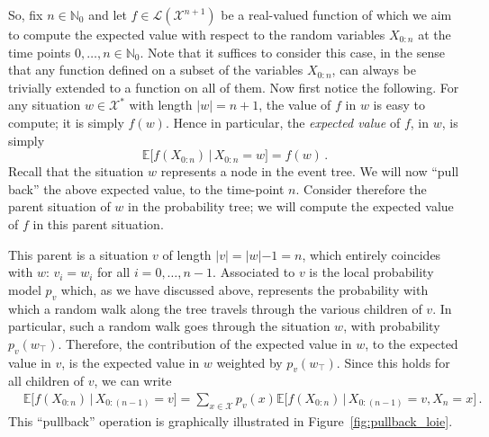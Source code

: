 \documentclass[graybox]{svmult}
\newcommand{\nats}{\mathbb{N}}
\newcommand{\natswith}{\nats_{0}}
\newcommand{\states}{\mathcal{X}}
\newcommand{\gambles}{\mathcal{L}}
\begin{document}
So, fix $n\in\natswith$ and let $f\in\gambles(\states^{n+1})$ be a real-valued function of which we aim to compute the expected value with respect to the random variables $X_{0:n}$ at the time points $0,\ldots,n\in\natswith$. Note that it suffices to consider this case, in the sense that any function defined on a subset of the variables $X_{0:n}$, can always be trivially extended to a function on all of them. Now first notice the following. For any situation $w\in\states^*$ with length $\lvert w\rvert = n+1$, the value of $f$ in $w$ is easy to compute; it is simply $f(w)$. Hence in particular, the \emph{expected value} of $f$, in $w$, is simply
\begin{equation*}
\mathbb{E}\bigl[f(X_{0:n})\,\big\vert\,X_{0:n}=w\bigr] = f(w)\,.
\end{equation*}
Recall that the situation $w$ represents a node in the event tree. We will now ``pull back'' the above expected value, to the time-point $n$. Consider therefore the parent situation of $w$ in the probability tree; we will compute the expected value of $f$ in this parent situation.

This parent is a situation $v$ of length $\lvert v\lvert=\lvert w\lvert-1=n$, which entirely coincides with $w$: $v_i=w_i$ for all $i=0,\ldots,n-1$. Associated to $v$ is the local probability model $p_v$ which, as we have discussed above, represents the probability with which a random walk along the tree travels through the various children of $v$. In particular, such a random walk goes through the situation $w$, with probability $p_v(w_\top)$. Therefore, the contribution of the expected value in $w$, to the expected value in $v$, is the expected value in $w$ weighted by $p_v(w_\top)$. Since this holds for all children of $v$, we can write
\begin{align*}
&\mathbb{E}\bigl[f(X_{0:n}) \,\big\vert\, X_{0:(n-1)}=v \bigr] = \sum_{x\in\states} p_v(x)\mathbb{E}\bigl[f(X_{0:n})\,\big\vert\,X_{0:(n-1)}=v,X_n=x\bigr]\,.
\end{align*}
This ``pullback'' operation is graphically illustrated in Figure~\ref{fig:pullback_loie}.
\end{document}
